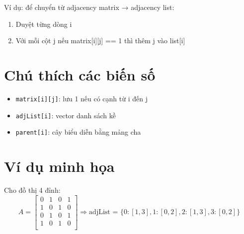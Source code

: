 \documentclass[12pt]{article}
\begin{document}
Ví dụ: để chuyển từ adjacency matrix → adjacency list:
\begin{enumerate}
    \item Duyệt từng dòng i
    \item Với mỗi cột j nếu matrix[i][j] == 1 thì thêm j vào list[i]
\end{enumerate}

\section*{Chú thích các biến số}
\begin{itemize}
    \item \texttt{matrix[i][j]}: lưu 1 nếu có cạnh từ i đến j
    \item \texttt{adjList[i]}: vector danh sách kề
    \item \texttt{parent[i]}: cây biểu diễn bằng mảng cha
\end{itemize}

\section*{Ví dụ minh họa}
Cho đồ thị 4 đỉnh:
\[
A = 
\begin{bmatrix}
0 & 1 & 0 & 1\\
1 & 0 & 1 & 0\\
0 & 1 & 0 & 1\\
1 & 0 & 1 & 0\\
\end{bmatrix}
\Rightarrow 
\text{adjList = } 
\{
0: [1,3], 1:[0,2], 2:[1,3], 3:[0,2]
\}
\]
\end{document}

